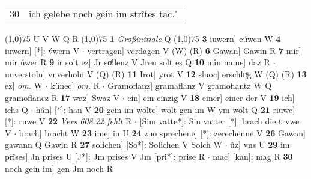 \documentclass[8pt,a4paper,notitlepage]{article}
\begin{document}
\begin{table}[ht]
\begin{minipage}[t]{0.5\linewidth}
\begin{tabular}{rl}
30 & ich gelebe noch gein im strîtes tac."\\ 
\end{tabular}
\scriptsize
\line(1,0){75} \newline
U V W Q R \newline
\line(1,0){75} \newline
\textbf{1} \textit{Großinitiale} Q  \newline
\line(1,0){75} \newline
\textbf{3} iuwern] eúwen W \textbf{4} iuwern] [*]: v́wern V  $\cdot$ vertragen] verdagen V (W) (R) \textbf{6} Gawan] Gawin R \textbf{7} mir] mir úwer R \textbf{9} ir solt ez] Jr soͤllenz V Jren solt es Q \textbf{10} mîn name] daz R  $\cdot$ unverstoln] vnverholn V (Q) (R) \textbf{11} Irot] yrot V \textbf{12} sluoc] erschluͦg W (Q) (R) \textbf{13} ez] \textit{om.} W  $\cdot$ künec] \textit{om.} R  $\cdot$ Gramoflanz] gramaflanz V gramoflantz W Q gramoflancz R \textbf{17} waz] Swaz V  $\cdot$ ein] ein einzig V \textbf{18} einer] einer der V \textbf{19} ich] ichs Q  $\cdot$ hân] [*]: han V \textbf{20} gein im wolte] wolt gen im W ym wolt Q \textbf{21} riuwe] [*]: ruwe V \textbf{22} \textit{Vers 608.22 fehlt} R   $\cdot$ [Sim vatte*]: Sin vatter [*]: brach die trvwe V  $\cdot$ brach] bracht W \textbf{23} ime] in U \textbf{24} zuo sprechene] [*]: zerechenne V \textbf{26} Gawan] gawann Q Gawin R \textbf{27} solichen] [So*]: Solichen V Solch W  $\cdot$ ûz] vns U \textbf{29} im prîses] Jn prises U [J*]: Jm prises V Jm [pri*]: prise R  $\cdot$ mac] [kan]: mag R \textbf{30} noch gein im] gen Jm noch R \newline
\end{minipage}
\end{table}
\end{document}

